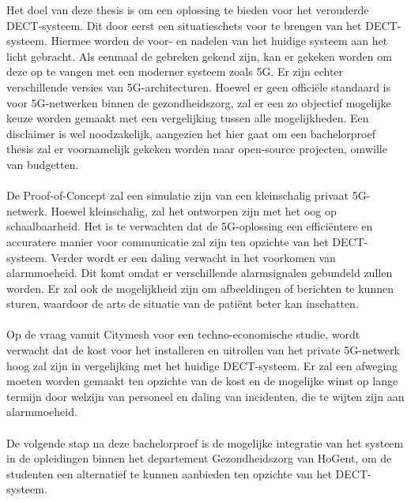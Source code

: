 Het doel van deze thesis is om een oplossing te bieden voor het verouderde DECT-systeem. Dit door eerst een situatieschets voor te brengen van het DECT-systeem. Hiermee worden de voor- en nadelen van het huidige systeem aan het licht gebracht. Als eenmaal de gebreken gekend zijn, kan er gekeken worden om deze op te vangen met een moderner systeem zoals 5G. Er zijn echter verschillende versies van 5G-architecturen. Hoewel er geen officiële standaard is voor 5G-netwerken binnen de gezondheidszorg, zal er een zo objectief mogelijke keuze worden gemaakt met een vergelijking tussen alle mogelijkheden. Een disclaimer is wel noodzakelijk, aangezien het hier gaat om een bachelorproef thesis zal er voornamelijk gekeken worden naar open-source projecten, omwille van budgetten. \\\\
De Proof-of-Concept zal een simulatie zijn van een kleinschalig privaat 5G-netwerk. Hoewel kleinschalig, zal het ontworpen zijn met het oog op schaalbaarheid. Het is te verwachten dat de 5G-oplossing een efficiëntere en accuratere manier voor communicatie zal zijn ten opzichte van het DECT-systeem. Verder wordt er een daling verwacht in het voorkomen van alarmmoeheid. Dit komt omdat er verschillende alarmsignalen gebundeld zullen worden. Er zal ook de mogelijkheid zijn om afbeeldingen of berichten te kunnen sturen, waardoor de arts de situatie van de patiënt beter kan inschatten.\\\\
Op de vraag vanuit Citymesh voor een techno-economische studie, wordt verwacht dat de kost voor het installeren en uitrollen van het private 5G-netwerk hoog zal zijn in vergelijking met het huidige DECT-systeem. Er zal een afweging moeten worden gemaakt ten opzichte van de kost en de mogelijke winst op lange termijn door welzijn van personeel en daling van incidenten, die te wijten zijn aan alarmmoeheid.\\\\
De volgende stap na deze bachelorproef is de mogelijke integratie van het systeem in de opleidingen binnen het departement Gezondheidszorg van HoGent, om de studenten een alternatief te kunnen aanbieden ten opzichte van het DECT-systeem.
